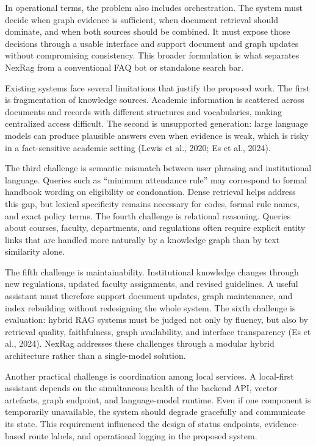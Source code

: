 In operational terms, the problem also includes orchestration. The system must decide when graph evidence is sufficient, when document retrieval should dominate, and when both sources should be combined. It must expose those decisions through a usable interface and support document and graph updates without compromising consistency. This broader formulation is what separates NexRag from a conventional FAQ bot or standalone search bar.

\label{sec:introduction-challenges}

Existing systems face several limitations that justify the proposed work. The first is fragmentation of knowledge sources. Academic information is scattered across documents and records with different structures and vocabularies, making centralized access difficult. The second is unsupported generation: large language models can produce plausible answers even when evidence is weak, which is risky in a fact-sensitive academic setting (Lewis et al., 2020; Es et al., 2024).

The third challenge is semantic mismatch between user phrasing and institutional language. Queries such as ``minimum attendance rule'' may correspond to formal handbook wording on eligibility or condonation. Dense retrieval helps address this gap, but lexical specificity remains necessary for codes, formal rule names, and exact policy terms. The fourth challenge is relational reasoning. Queries about courses, faculty, departments, and regulations often require explicit entity links that are handled more naturally by a knowledge graph than by text similarity alone.

The fifth challenge is maintainability. Institutional knowledge changes through new regulations, updated faculty assignments, and revised guidelines. A useful assistant must therefore support document updates, graph maintenance, and index rebuilding without redesigning the whole system. The sixth challenge is evaluation: hybrid RAG systems must be judged not only by fluency, but also by retrieval quality, faithfulness, graph availability, and interface transparency (Es et al., 2024). NexRag addresses these challenges through a modular hybrid architecture rather than a single-model solution.

Another practical challenge is coordination among local services. A local-first assistant depends on the simultaneous health of the backend API, vector artefacts, graph endpoint, and language-model runtime. Even if one component is temporarily unavailable, the system should degrade gracefully and communicate its state. This requirement influenced the design of status endpoints, evidence-based route labels, and operational logging in the proposed system.

